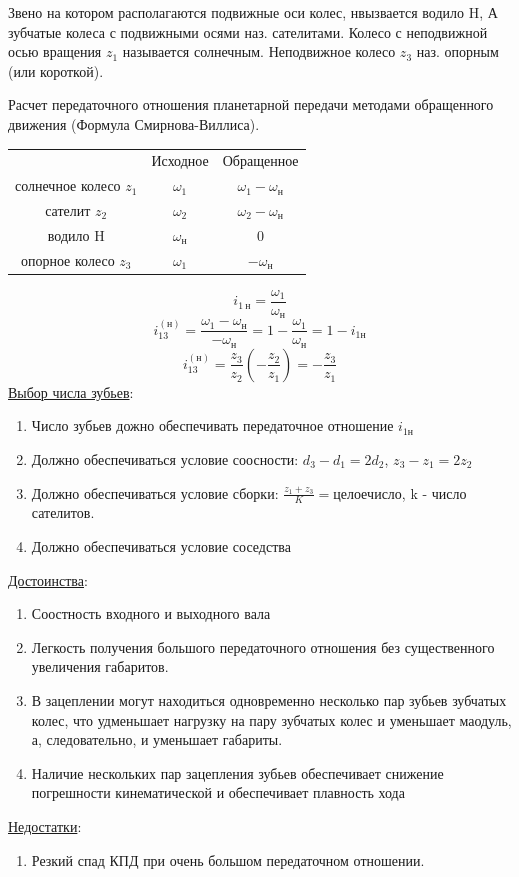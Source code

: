 \documentclass{article}
\begin{document}
\begin{multicols}{3}
Звено на котором располагаются подвижные оси колес, нвызвается водило H, А зубчатые колеса с подвижными осями наз. сателитами. Колесо с неподвижной осью вращения $z_1$ называется солнечным. Неподвижное колесо $z_3$ наз. опорным (или короткой).

Расчет передаточного отношения планетарной передачи методами обращенного движения (Формула Смирнова-Виллиса).

\begin{tabular}{ccc}
	& Исходное & Обращенное\\
	солнечное колесо $z_1$ & $\omega_1$ & $\omega_1 - \omega_н$\\
	сателит $z_2$ & $\omega_2$ & $\omega_2 - \omega_н$\\
	водило H & $\omega_н$ & 0\\
	опорное колесо $z_3$ & $\omega_1$ & $- \omega_н$\\
\end{tabular}
$$
i_{1\:н} = \frac{\omega_1}{\omega_н}
$$
$$
i_{13}^{(н)} = \frac{\omega_1 - \omega_н}{- \omega_н}  = 1 - \frac{\omega_1}{\omega_н} = 1 - i_{1н}
$$
$$
i_{13}^{(н)} = \frac{z_3}{z_2} \left(- \frac{z_2}{z_1} \right) = - \frac{z_3}{z_1}
$$
\underline{Выбор числа зубьев}:
\begin{enumerate}
	\item Число зубьев дожно обеспечивать передаточное отношение $i_{1н}$
	\item Должно обеспечиваться условие соосности: $d_3 - d_1 = 2 d_2$, $z_3 - z_1 = 2 z_2$
	\item Должно обеспечиваться условие сборки: $\frac{z_1 + z_3}{K} = целое число$, k - число сателитов.
	\item Должно обеспечиваться условие соседства
\end{enumerate}
\underline{Достоинства}:
\begin{enumerate}
	\item Соостность входного и выходного вала
	\item Легкость получения большого передаточного отношения без существенного увеличения габаритов.
	\item В зацеплении могут находиться одновременно несколько пар зубьев зубчатых колес, что удменьшает нагрузку на пару зубчатых колес и уменьшает маодуль, а, следовательно, и уменьшает габариты.
	\item Наличие нескольких пар зацепления зубьев обеспечивает снижение погрешности кинематической и обеспечивает плавность хода
\end{enumerate}
\underline{Недостатки}:
\begin{enumerate}
	\item Резкий спад КПД при очень большом передаточном отношении.
\end{enumerate}


\end{multicols}
\end{document}
